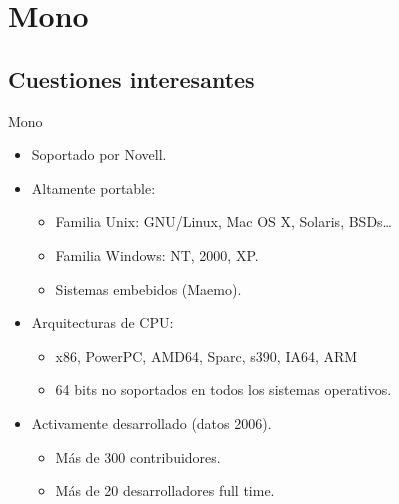 \documentclass{beamer}
\begin{document}
\section{Mono}

\subsection{Cuestiones interesantes}

\begin{frame}{Mono}
  \begin{itemize}
    \item Soportado por Novell.
    \item Altamente portable:
    \begin{itemize}
      \item Familia Unix: GNU/Linux, Mac OS X, Solaris, BSDs\ldots
      \item Familia Windows: NT, 2000, XP.
      \item Sistemas embebidos (Maemo).
    \end{itemize}

    \item Arquitecturas de CPU:
    \begin{itemize}
      \item x86, PowerPC, AMD64, Sparc, s390, IA64, ARM
      \item 64 bits no soportados en todos los sistemas operativos.
    \end{itemize}

    \item Activamente desarrollado (datos 2006).
    \begin{itemize}
      \item Más de 300 contribuidores.
      \item Más de 20 desarrolladores full time.
    \end{itemize}
  \end{itemize}
\end{frame}

\begin{frame}[plain]
  \begin{centering}
  \end{centering}
\end{frame}
\end{document}
